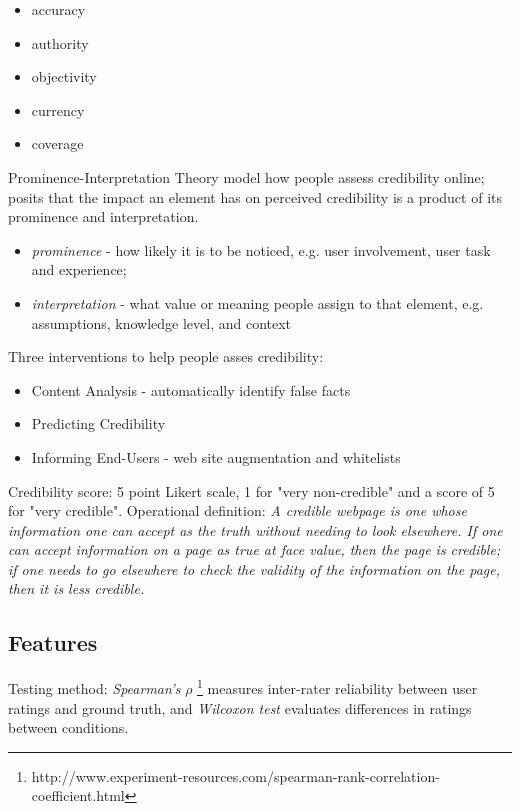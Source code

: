 \documentclass{article}
\begin{document}
\begin{itemize}
\item accuracy
\item authority
\item objectivity
\item currency
\item coverage
\end{itemize}

Prominence-Interpretation Theory model how people assess credibility online; posits that the impact an element has on perceived credibility is a product of its prominence and interpretation.
\begin{itemize}
\item \textit{prominence} - how likely it is to be noticed, e.g. user involvement, user task and experience;
\item \textit{interpretation} - what value or meaning people assign to that element, e.g. assumptions, knowledge level, and context
\end{itemize}

Three interventions to help people asses credibility:

\begin{itemize}
\item Content Analysis - automatically identify false facts
\item Predicting Credibility
\item Informing End-Users - web site augmentation and whitelists
\end{itemize}

Credibility score: 5 point Likert scale, 1 for "very non-credible" and a score of 5 for "very credible". Operational definition: \textit{A credible webpage is one whose information one can accept as the truth without needing to look elsewhere. If one can accept information on a page as true at face value, then the page is credible; if one needs to go elsewhere to check the validity of the information on the page, then it is less credible.}

\subsection{Features}

Testing method: \textit{Spearman’s} $\rho$ \footnote{http://www.experiment-resources.com/spearman-rank-correlation-coefficient.html} measures inter-rater reliability
between user ratings and ground truth, and \textit{Wilcoxon test} evaluates differences in ratings between conditions.
\end{document}
